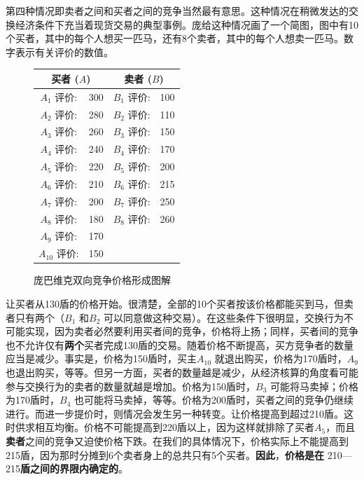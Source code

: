 \documentclass[fontset=fandol, a4paper, 12pt, openright]{ctexbook}
\begin{document}
第四种情况即卖者之间和买者之间的竞争当然最有意思。这种情况在稍微发达的交换经济条件下充当着现货交易的典型事例。庞给这种情况画了一个简图，图中有10个买者，其中的每个人想买一匹马，还有8个卖者，其中的每个人想卖一匹马。数字表示有关评价的数值。

\begin{figure}[htbp]
    \centering
    \small
    \begin{tabular}{c c | c c}
        \hline
        \multicolumn{2}{c|}{买者 ($A$)} & \multicolumn{2}{c}{卖者 ($B$)} \\
        \hline
        $A_1$ 评价: & 300 & $B_1$ 评价: & 100 \\
        $A_2$ 评价: & 280 & $B_2$ 评价: & 110 \\
        $A_3$ 评价: & 260 & $B_3$ 评价: & 150 \\
        $A_4$ 评价: & 240 & $B_4$ 评价: & 170 \\
        $A_5$ 评价: & 220 & $B_5$ 评价: & 200 \\
        $A_6$ 评价: & 210 & $B_6$ 评价: & 215 \\
        $A_7$ 评价: & 200 & $B_7$ 评价: & 250 \\
        $A_8$ 评价: & 180 & $B_8$ 评价: & 260 \\
        $A_9$ 评价: & 170 & & \\
        $A_{10}$ 评价: & 150 & & \\
        \hline
    \end{tabular}
    \caption{庞巴维克双向竞争价格形成图解}
\end{figure}

让买者从130盾的价格开始。很清楚，全部的10个买者按该价格都能买到马，但卖者只有两个（$B_1$ 和$B_2$ 可以同意做这种交易）。在这些条件下很明显，交换行为不可能实现，因为卖者必然要利用买者间的竞争，价格将上扬；同样，买者间的竞争也不允许仅有\textbf{两个}买者完成130盾的交易。随着价格不断提高，买方竞争者的数量应当是减少。事实是，价格为150盾时，买主$A_{10}$ 就退出购买，价格为170盾时，$A_9$ 也退出购买，等等。但另一方面，买者的数量越是减少，从经济核算的角度看可能参与交换行为的卖者的数量就越是增加。价格为150盾时，$B_3$ 可能将马卖掉；价格为170盾时，$B_4$ 也可能将马卖掉，等等。价格为200盾时，买者之间的竞争仍继续进行。而进一步提价时，则情况会发生另一种转变。让价格提高到超过210盾。这时供求相互均衡。价格不可能提高到220盾以上，因为这样就排除了买者$A_5$，而且\textbf{卖者}之间的竞争又迫使价格下跌。在我们的具体情况下，价格实际上不能提高到215盾，因为那时分摊到6个卖者身上的总共只有5个买者。\textbf{因此}，\textbf{价格是在} 210—215\textbf{盾之间的界限内确定的}。
\end{document}
